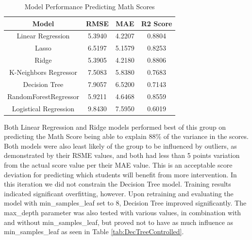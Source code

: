 \documentclass[man,floatsintext]{apa6} %
\begin{document}
\begin{table}[H]
    \centering
    \begin{tabular}{|c|c|c|c|}
    \hline
         Model & RMSE & MAE & R2 Score\\
         \hline\hline
         Linear Regression & 5.3940 & 4.2207 & 0.8804\\
         \hline
         Lasso & 6.5197 & 5.1579 & 0.8253\\
         \hline
         Ridge & 5.3905 & 4.2180 & 0.8806\\
         \hline
         K-Neighbors Regressor & 7.5083 & 5.8380 & 0.7683\\
         \hline
         Decision Tree & 7.9057 & 6.5200 & 0.7143\\
         \hline
         RandomForestRegressor & 5.9211 & 4.6468 & 0.8559\\
         \hline
         Logistical Regression & 9.8430 & 7.5950 & 0.6019\\
         \hline
    \end{tabular}
    \caption{Model Performance Predicting Math Scores}
    \label{tab:InitModelPerfMath}
\end{table}
Both Linear Regression and Ridge models performed best of this group on predicting the Math Score being able to explain 88\% of the variance in the scores. Both models were also least likely of the group to be influenced by outliers, as demonstrated by their RSME values, and both had less than 5 points variation from the actual score value per their MAE value.  This is an acceptable score deviation for predicting which students will benefit from more intervention.
In this iteration we did not constrain the Decision Tree model. Training results indicated significant overfitting, however. Upon retraining and evaluating the model with min\_samples\_leaf set to 8, Decision Tree improved significantly. The max\_depth parameter was also tested with various values, in combination with and without min\_samples\_leaf, but proved not to have as much influence as min\_samples\_leaf as seen in Table \ref{tab:DecTreeControlled}.
\end{document}
